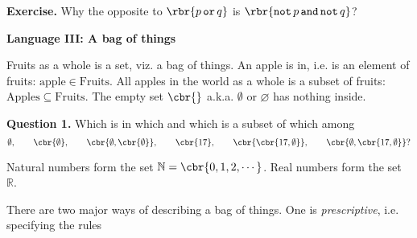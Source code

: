 \documentclass[oneside,12pt]{article}
\def\opand{\mathop{\mathtt{and}}}
\def\opor{\mathop{\mathtt{or}}}
\def\opnot{\mathop{\mathtt{not}}}
\begin{document}
\leavevmode

\hspace{-0.75in}\llap{> } \textbf{Exercise.} Why the opposite to $ \rbr{ p \opor q } $ is $ \rbr{ \opnot p \opand \opnot q } $?

\newpage

\hspace{-0.75in} \textbf{Language III: A bag of things}

\leavevmode

Fruits as a whole is a set, viz. a bag of things. An apple is in, i.e. is an element of fruits: $ \mathord{\text{apple}} \in \mathord{\text{Fruits}} $. All apples in the world as a whole is a subset of fruits: $ \mathord{\text{Apples}} \subseteq \mathord{\text{Fruits}} $. The empty set $ \cbr{} $ a.k.a. $\emptyset$ or $\varnothing$ has nothing inside.

\quitvmode

\hspace{-0.75in} \textbf{Question 1.} Which is in which and which is a subset of which among
\begin{equation*}
\emptyset, \qquad \cbr{\emptyset}, \qquad \cbr{ \emptyset, \cbr{\emptyset} }, \qquad \cbr{17}, \qquad \cbr{ \cbr{ 17, \emptyset } }, \qquad \cbr{ \emptyset, \cbr{ 17, \emptyset }}?
\end{equation*}

\leavevmode

Natural numbers form the set $ \mathbb{N} = \cbr{ 0, 1, 2, \cdots } $. Real numbers form the set $\mathbb{R}$.

\leavevmode

There are two major ways of describing a bag of things. One is \emph{prescriptive}, i.e. specifying the rules 
\end{document}

